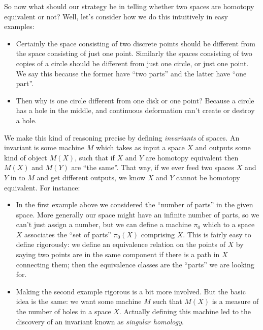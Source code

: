 \begin{nothing}[Invariants]
  So now what should our strategy be in telling whether two spaces are
  homotopy equivalent or not? Well, let's consider how we do this
  intuitively in easy examples:
  \begin{itemize}
  \item Certainly the space consisting of two discrete points should
    be different from the space consisting of just one
    point. Similarly the spaces consisting of two copies of a circle
    should be different from just one circle, or just one point. We
    say this because the former have ``two parts'' and the latter have
    ``one part''.
  \item Then why is one circle different from one disk or one point?
    Because a circle has a hole in the middle, and continuous
    deformation can't create or destroy a hole.
  \end{itemize}
  
  We make this kind of reasoning precise by defining \emph{invariants}
  of spaces. An invariant is some machine $M$ which takes as input a
  space $X$ and outputs some kind of object $M(X)$, such that if $X$
  and $Y$ are homotopy equivalent then $M(X)$ and $M(Y)$ are ``the
  same''. That way, if we ever feed two spaces $X$ and $Y$ in to $M$
  and get different outputs, we know $X$ and $Y$ cannot be homotopy
  equivalent. For instance:
  \begin{itemize}
  \item In the first example above we considered the ``number of
    parts'' in the given space. More generally our space might have an
    infinite number of parts, so we can't just assign a number, but we
    can define a machine $\pi_0$ which to a space $X$ associates the
    ``set of parts'' $\pi_0(X)$ comprising $X$. This is fairly easy to
    define rigorously: we define an equivalence relation on the points
    of $X$ by saying two points are in the same component if there is
    a path in $X$ connecting them; then the equivalence classes are
    the ``parts'' we are looking for.
  \item Making the second example rigorous is a bit more involved. But
    the basic idea is the same: we want some machine $M$ such that
    $M(X)$ is a measure of the number of holes in a space
    $X$. Actually defining this machine led to the discovery of an
    invariant known as \emph{singular homology}.
  \end{itemize}
\end{nothing}

